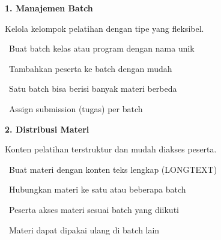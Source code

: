 \documentclass[a4paper]{article}
\begin{document}
\vspace{6pt}

\noindent
\begin{minipage}[t]{0.485\textwidth}
    \colorbox{VioletPrimary}{%
        \begin{minipage}{\dimexpr\textwidth-14pt}
            \vspace{5pt}
            {\fontsize{10}{13}\selectfont\bfseries\color{White} 1. Manajemen Batch}
            \vspace{5pt}
        \end{minipage}}
    \vspace{5pt}
    {\fontsize{9}{12}\selectfont\color{TextDark}%
    Kelola kelompok pelatihan dengan tipe yang fleksibel.\par\vspace{3pt}
    \textbullet\ Buat batch kelas atau program dengan nama unik\par\vspace{2pt}%
    \textbullet\ Tambahkan peserta ke batch dengan mudah\par\vspace{2pt}%
    \textbullet\ Satu batch bisa berisi banyak materi berbeda\par\vspace{2pt}%
    \textbullet\ Assign submission (tugas) per batch}%
\end{minipage}%
\hfill
\begin{minipage}[t]{0.485\textwidth}
    \colorbox{BluePrimary}{%
        \begin{minipage}{\dimexpr\textwidth-14pt}
            \vspace{5pt}
            {\fontsize{10}{13}\selectfont\bfseries\color{White} 2. Distribusi Materi}
            \vspace{5pt}
        \end{minipage}}
    \vspace{5pt}
    {\fontsize{9}{12}\selectfont\color{TextDark}%
    Konten pelatihan terstruktur dan mudah diakses peserta.\par\vspace{3pt}
    \textbullet\ Buat materi dengan konten teks lengkap (LONGTEXT)\par\vspace{2pt}%
    \textbullet\ Hubungkan materi ke satu atau beberapa batch\par\vspace{2pt}%
    \textbullet\ Peserta akses materi sesuai batch yang diikuti\par\vspace{2pt}%
    \textbullet\ Materi dapat dipakai ulang di batch lain}%
\end{minipage}
\end{document}
